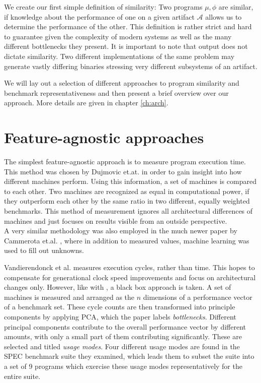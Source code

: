 \documentclass[../bachelor_paper.tex]{subfiles}
\begin{document}
We create our first simple definition of similarity: Two programs $\mu, \phi$ are similar, if knowledge about the performance of one on a given artifact $\mathcal{A}$ allows us to determine the performance of the other. This definition is rather strict and hard to guarantee given the complexity of modern systems as well as the many different bottlenecks they present. It is important to note that output does not dictate similarity. Two different implementations of the same problem may generate vastly differing binaries stressing very different subsystems of an artifact.

We will lay out a selection of different approaches to program similarity and benchmark representativeness and then present a brief overview over our approach. More details are given in chapter \ref{ch:arch}.

\section{Feature-agnostic approaches}
	\label{prob/angno}
The simplest feature-agnostic approach is to measure program execution time. This method was chosen by Dujmovic et.at. \cite{dujmovicEvolutionEvaluationSPEC1998} in order to gain insight into how different machines perform. Using this information, a set of machines is compared to each other. Two machines are recognized as equal in computational power, if they outperform each other by the same ratio in two different, equally weighted benchmarks. This method of measurement ignores all architectural differences of machines and just focuses on results visible from an outside perspective.\\
A very similar methodology was also employed in the much newer paper by Cammerota et.al. \cite{cammarotaOptimizingProgramPerformance2013}, where in addition to measured values, machine learning was used to fill out unknowns.

Vandierendonck et al. \cite{vandierendonckManyBenchmarksStress} measures execution cycles, rather than time. This hopes to compensate for generational clock speed improvements and focus on architectural changes only. However, like with \cite{dujmovicEvolutionEvaluationSPEC1998}, a black box approach is taken. A set of machines is measured and arranged as the $n$ dimensions of a performance vector of a benchmark set. These cycle counts are then transformed into principle components by applying \ac{PCA}, which the paper labels \emph{bottlenecks}. Different principal components contribute to the overall performance vector by different amounts, with only a small part of them contributing significantly. These are selected and titled \emph{usage modes}. Four different usage modes are found in the \ac{SPEC} benchmark suite they examined, which leads them to subset the suite into a set of 9 programs which exercise these usage modes representatively for the entire suite.
\end{document}
